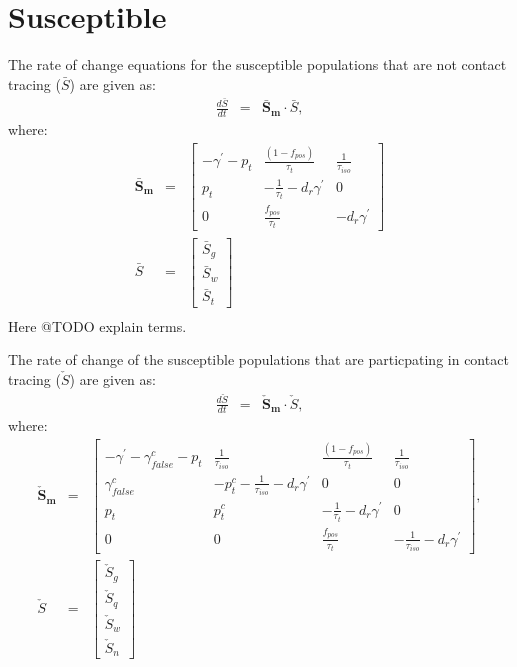 \documentclass[notitlepage, superscriptaddress]{revtex4-2}
\begin{document}
\section{Susceptible}
The rate of change equations for the susceptible populations that are not contact tracing ($\bar{S}$) are given as:
\begin{eqnarray}
\frac{d\bar{S}}{dt} &=& \boldsymbol{\bar{S}_{m}} \cdot  \bar{S}, 
\end{eqnarray}
where:
\begin{eqnarray}
\boldsymbol{\bar{S}_{m}} &=&
\begin{bmatrix}
-\gamma^{'} - p_{t}  &  \frac{(1-f_{pos})}{\tau_{t}}             & \frac{1}{\tau_{iso}} \\ 
 p_{t}              & -\frac{1}{\tau_{t}} - d_{r} \gamma^{'}    & 0  \\ 
 0                  & \frac{f_{pos}}{\tau_{t}}                  &  -d_{r} \gamma^{'}
\end{bmatrix} \\ 
%
\bar{S} &=& 
\begin{bmatrix}
\bar{S}_{g} \\ \bar{S}_{w}\\ \bar{S}_{t}
\end{bmatrix} \\
\end{eqnarray}
Here @TODO explain terms.

The rate of change of the susceptible populations that are particpating in contact tracing ($\check{S}$) are given as:
\begin{eqnarray}
\frac{d\check{S}}{dt} &=& \boldsymbol{\check{S}_{m}} \cdot \check{S},
\end{eqnarray}
where:
\begin{eqnarray}
\boldsymbol{\check{S}_{m}} &=&
\begin{bmatrix}
-\gamma^{'} -\gamma^{c}_{false} - p_{t}  & \frac{1}{\tau_{iso}}     & \frac{(1-f_{pos})}{\tau_{t}}             & \frac{1}{\tau_{iso}} \\ 
\gamma^{c}_{false}          &  -p^{c}_{t}  - \frac{1}{\tau_{iso}} -d_{r} \gamma^{'}          &  0    & 0  \\ 
p_{t}                          &  p^{c}_{t}                  &  -\frac{1}{\tau_{t}}  -d_{r} \gamma^{'}  & 0 \\
0 & 0 & \frac{f_{pos}}{\tau_{t}}  & -\frac{1}{\tau_{iso}}  -d_{r} \gamma^{'}
\end{bmatrix}, \\
\check{S} &=& 
\begin{bmatrix}
\check{S}_{g} \\ \check{S}_{q} \\ \check{S}_{w}\\ \check{S}_{n}
\end{bmatrix}
\end{eqnarray}
\end{document}
